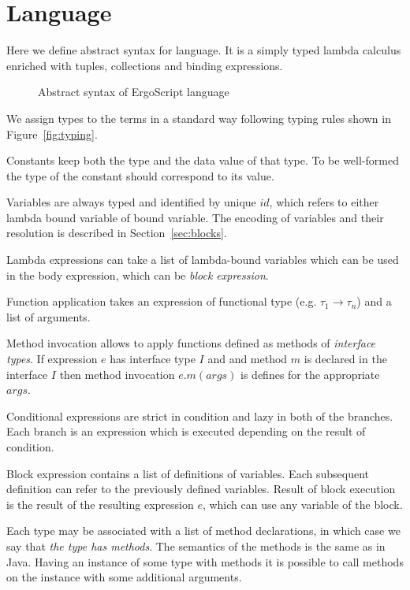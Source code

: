 \section{Language}
\label{sec:language}

Here we define abstract syntax for \langname language. It is a simply typed
lambda calculus enriched with tuples, collections and  binding
expressions.

\begin{figure}[h]
    \footnotesize
    
    \caption{Abstract syntax of ErgoScript language}
    \label{fig:language}
\end{figure}
    
We assign types to the terms in a standard way following typing rules shown
in Figure~\ref{fig:typing}.

Constants keep both the type and the data value of that type. To be
well-formed the type of the constant should correspond to its value.

Variables are always typed and identified by unique $id$, which refers to
either lambda bound variable of  bound variable. The encoding of
variables and their resolution is described in Section~\ref{sec:blocks}.

Lambda expressions can take a list of lambda-bound variables which can be
used in the body expression, which can be \emph{block expression}. 

Function application takes an expression of functional type (e.g. $\tau_1 \to
\tau_n$) and a list of arguments.

Method invocation allows to apply functions defined as methods of
\emph{interface types}. If expression $e$ has interface type $I$ and and
method $m$ is declared in the interface $I$ then method invocation
$e.m(args)$ is defines for the appropriate $args$.

Conditional expressions are strict in condition and lazy in both of the
branches. Each branch is an expression which is executed depending on the
result of condition.

Block expression contains a list of  definitions of variables. Each
subsequent definition can refer to the previously defined variables. Result
of block execution is the result of the resulting expression $e$, which can
use any variable of the block.

Each type may be associated with a list of method declarations, in which case
we say that \emph{the type has methods}. The semantics of the methods is the
same as in Java. Having an instance of some type with methods it is possible
to call methods on the instance with some additional arguments.